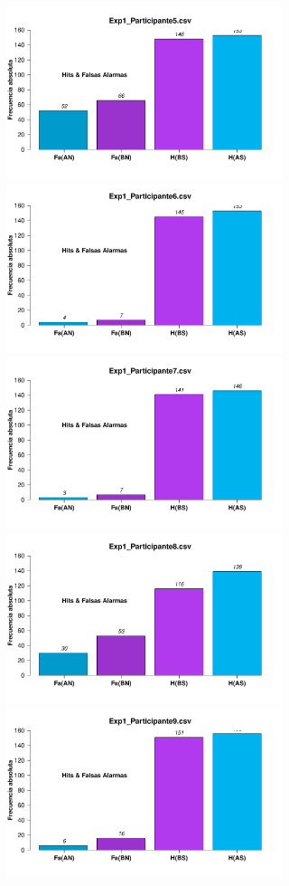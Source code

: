 \documentclass[a4paper ]{article}
\begin{document}
\begin{figure}[th]
\includegraphics[width=9cm, height=5cm]{Figures/MirrorRate_Exp1_P5} \includegraphics[width=9cm, height=5cm]{Figures/MirrorRate_Exp1_P6}
\includegraphics[width=9cm, height=5cm]{Figures/MirrorRate_Exp1_P7} \includegraphics[width=9cm, height=5cm]{Figures/MirrorRate_Exp1_P8} 
\includegraphics[width=9cm, height=5cm]{Figures/MirrorRate_Exp1_P9}
\end{figure}
\end{document}
